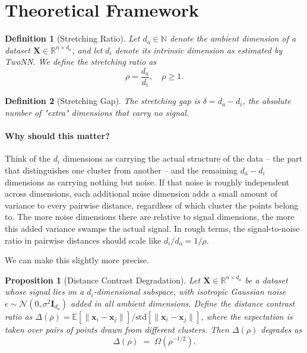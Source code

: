 \documentclass[pdflatex,sn-mathphys-num]{sn-jnl}
\theoremstyle{thmstyleone}
\newtheorem{definition}{Definition}
\newtheorem{proposition}{Proposition}
\begin{document}
\section{Theoretical Framework}

\begin{definition}[Stretching Ratio]
Let $d_a \in \mathbb{N}$ denote the ambient dimension of a dataset
$\mathbf{X} \in \mathbb{R}^{n \times d_a}$, and let $d_i$ denote its intrinsic
dimension as estimated by TwoNN. We define the \textit{stretching ratio} as
\begin{equation}
    \rho = \frac{d_a}{d_i}, \quad \rho \geq 1.
\end{equation}
\end{definition}

\begin{definition}[Stretching Gap]
The \textit{stretching gap} is $\delta = d_a - d_i$, the absolute number of
"extra" dimensions that carry no signal.
\end{definition}

\paragraph{Why should this matter?}
Think of the $d_i$ dimensions as carrying the actual structure of the data --
the part that distinguishes one cluster from another -- and the remaining
$d_a - d_i$ dimensions as carrying nothing but noise. If that noise is roughly
independent across dimensions, each additional noise dimension adds a small
amount of variance to every pairwise distance, regardless of which cluster the
points belong to. The more noise dimensions there are relative to signal
dimensions, the more this added variance swamps the actual signal. In rough
terms, the signal-to-noise ratio in pairwise distances should scale like
$d_i / d_a = 1/\rho$.

We can make this slightly more precise.

\begin{proposition}[Distance Contrast Degradation]
\label{prop:contrast}
Let $\mathbf{X} \in \mathbb{R}^{n \times d_a}$ be a dataset whose signal lies on a
$d_i$-dimensional subspace, with isotropic Gaussian noise
$\epsilon \sim \mathcal{N}(0, \sigma^2 \mathbf{I}_{d_a})$ added in all ambient
dimensions. Define the \textit{distance contrast ratio} as
$\Delta(\rho) = \mathbb{E}[\|\mathbf{x}_i - \mathbf{x}_j\|] / \mathrm{std}[\|\mathbf{x}_i - \mathbf{x}_j\|]$,
where the expectation is taken over pairs of points drawn from different
clusters. Then $\Delta(\rho)$ degrades as
\begin{equation}
    \Delta(\rho) \;=\; \Omega\!\left(\rho^{-1/2}\right).
\end{equation}
\end{proposition}
\end{document}

